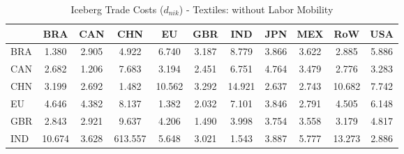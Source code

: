 \begin{table}[htbp]
\centering
\caption{Iceberg Trade Costs ($d_{nik}$) - Textiles: without Labor Mobility} 
\label{tab:iceberg_Textiles}
\begin{tabular}{lcccccccccc}
  \hline
 & BRA & CAN & CHN & EU & GBR & IND & JPN & MEX & RoW & USA \\ 
  \hline
BRA & \textcolor[RGB]{242,157,13}{1.380} & \textcolor[RGB]{153,99,102}{2.905} & \textcolor[RGB]{56,36,199}{4.922} & \textcolor[RGB]{36,23,219}{6.740} & \textcolor[RGB]{133,86,122}{3.187} & \textcolor[RGB]{20,13,235}{8.779} & \textcolor[RGB]{102,66,153}{3.866} & \textcolor[RGB]{112,73,143}{3.622} & \textcolor[RGB]{158,102,97}{2.885} & \textcolor[RGB]{43,28,212}{5.886} \\ 
  CAN & \textcolor[RGB]{181,117,74}{2.682} & \textcolor[RGB]{247,160,8}{1.206} & \textcolor[RGB]{28,18,227}{7.683} & \textcolor[RGB]{130,84,125}{3.194} & \textcolor[RGB]{196,127,59}{2.451} & \textcolor[RGB]{33,21,222}{6.751} & \textcolor[RGB]{64,41,191}{4.764} & \textcolor[RGB]{120,78,135}{3.479} & \textcolor[RGB]{171,111,84}{2.776} & \textcolor[RGB]{125,81,130}{3.283} \\ 
  CHN & \textcolor[RGB]{128,82,128}{3.199} & \textcolor[RGB]{178,115,76}{2.692} & \textcolor[RGB]{235,152,20}{1.482} & \textcolor[RGB]{13,8,242}{10.562} & \textcolor[RGB]{122,79,133}{3.292} & \textcolor[RGB]{3,2,252}{14.921} & \textcolor[RGB]{184,119,71}{2.637} & \textcolor[RGB]{176,114,79}{2.743} & \textcolor[RGB]{8,5,247}{10.682} & \textcolor[RGB]{25,16,230}{7.742} \\ 
  EU & \textcolor[RGB]{71,46,184}{4.646} & \textcolor[RGB]{79,51,176}{4.382} & \textcolor[RGB]{23,15,232}{8.137} & \textcolor[RGB]{240,155,15}{1.382} & \textcolor[RGB]{209,135,46}{2.032} & \textcolor[RGB]{31,20,224}{7.101} & \textcolor[RGB]{105,68,150}{3.846} & \textcolor[RGB]{168,109,87}{2.791} & \textcolor[RGB]{74,48,181}{4.505} & \textcolor[RGB]{41,26,214}{6.148} \\ 
  GBR & \textcolor[RGB]{163,106,92}{2.843} & \textcolor[RGB]{150,97,105}{2.921} & \textcolor[RGB]{18,12,237}{9.637} & \textcolor[RGB]{82,53,173}{4.206} & \textcolor[RGB]{232,150,23}{1.490} & \textcolor[RGB]{89,58,166}{3.998} & \textcolor[RGB]{107,69,148}{3.754} & \textcolor[RGB]{115,74,140}{3.558} & \textcolor[RGB]{135,87,120}{3.179} & \textcolor[RGB]{61,40,194}{4.817} \\ 
  IND & \textcolor[RGB]{10,7,245}{10.674} & \textcolor[RGB]{110,71,145}{3.628} & \textcolor[RGB]{0,0,255}{613.557} & \textcolor[RGB]{48,31,207}{5.648} & \textcolor[RGB]{145,94,110}{3.021} & \textcolor[RGB]{227,147,28}{1.543} & \textcolor[RGB]{97,63,158}{3.887} & \textcolor[RGB]{46,30,209}{5.777} & \textcolor[RGB]{5,3,250}{13.273} & \textcolor[RGB]{156,101,99}{2.886} \\ 

\end{tabular}
\end{table}
